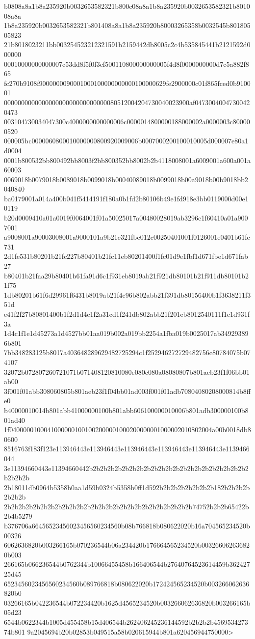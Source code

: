 b0808a8a1b8a235920b0032653582321b800c08a8a1b8a235920b0032653582321b801008a8a
1b8a235920b0032653582321b801408a8a1b8a235920b80003265358b0032545b80180505823
21b8018023211bb003254523212321591b2159442db8005c2c4b535845441b2121592d000000
00010000000000007c53dd8f5f0f3cf500110800000000005f4d8f0000000000d7c5a882f865
fc270b9108f9000000090001000100000000000100000629fe2900000c01f865fced0b910001
000000000000000000000000000000080512004204730040023900af04730040047300420473
003104730034047300c4000000000000006c0000014800000188000002a0000003c800000520
000005bc0000060800010000000800920009006b0007000200100010005d000007e80a1d0004
0001b800532bb800492bb8003f2bb800352bb8002b2b4118008001a6009001a600a001a60003
0069018b0079018b0089018b0099018b00040089018b0099018b00a9018b00b9018bb2040840
ba0179001a014a400b041f5414191f180a0b1fd2b80106b49e1fd918e3bb0119000d00e10119
b20d0009410a01a0019f0064001f01a50025017a00480028019ab3296c1f60410a01a9007001
a9008001a90003008001a9000101a9b21e321fbe012c00250401001f0126001e0401b61fe731
2d1fe531b80201b21fc227b80401b21fc11eb80201400f1fc01d9e1fbf1d671fbe1d671fab27
b80401b21faa29b80401b61fa91d6c1f931eb8019ab21f921db80101b21f911db80101b21f75
1db80201b61f6d29961f6431b8019ab21f4c96b802abb21f391db80156400b1f3638211f351d
e41f2f27b80801400b1f2d1d4c1f2a31cd1f241db802abb21f201eb8012540111f1c1d931f3a
1d4c1f1e1d45273a1d4527bb01aa019b002a019bb2254a1fba019b0025017ab349293896b801
7bb348283125b8017a403648289629482725294c1f252946272729482756c80784075b074107
32072b072807260721071b071408120810080e080c080a08080807b801acb23f1f06bb01ab00
3f001f01abb308060805b801aeb23f1f04bb01ad003f001f01adb70804080208000814b8ffe0
b40000010014b801abb41000000100b801abb606100000010006b801adb300000100b801ad40
1f04000001000410000001001002000001000200000001000002010802004a00b0018db80600
8516763f183f123e113946443e113946443e113946443e113946443e113946443e1139466044
3e11394660443e11394660442b2b2b2b2b2b2b2b2b2b2b2b2b2b2b2b2b2b2b2b2b2b2b2b2b2b
2b18011db0964b5358b0aa1d59b0324b5358b0ff1d592b2b2b2b2b2b2b2b182b2b2b2b2b2b2b
2b2b2b2b2b2b2b2b2b2b2b2b2b2b2b2b2b2b2b2b2b2b2b2b2b2b74752b2b2b65422b2b4b5279
b376706a66456523456023456560234560b08b766818b080622020b16a704565234520b00326
6062636820b003266165b070236544b06a234420b176664565234520b003266062636820b003
266165b066236544b0762344b10066455458b166406544b27640764523614459b36242725d45
6523456023456560234560b089766818b080622020b172424565234520b003266062636820b0
03266165b042236544b072234420b1625d4565234520b003266062636820b003266165b05d23
6544b0622344b1005d455458b15d406544b262406245236144592b2b2b2b456953427374b801
9a2045694b20b02853b049515a58b020615944b801a620456944750000>
